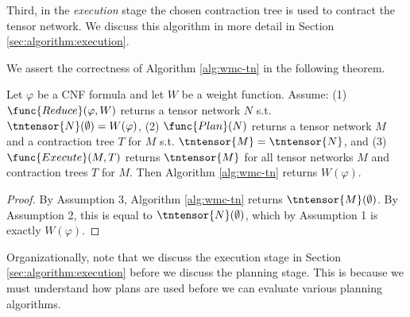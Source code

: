 Third, in the \emph{execution} stage the chosen contraction tree is used to contract the tensor network. We discuss this algorithm in more detail in Section \ref{sec:algorithm:execution}.

We assert the correctness of Algorithm \ref{alg:wmc-tn} in the following theorem.
\begin{theorem}
\label{thm:alg-correctness}
Let $\varphi$ be a CNF formula and let $W$ be a weight function. 
    Assume:
    (1) $\func{Reduce}(\varphi, W)$ returns a tensor network $N$ s.t. $\tntensor{N}(\emptyset) = W(\varphi)$,
    (2) $\func{Plan}(N)$ returns a tensor network $M$ and a contraction tree $T$ for $M$ s.t. $\tntensor{M} = \tntensor{N}$, and
    (3) $\func{Execute}(M, T)$ returns $\tntensor{M}$ for all tensor networks $M$ and contraction trees $T$ for $M$.
Then Algorithm \ref{alg:wmc-tn} returns $W(\varphi)$.
\end{theorem}
\begin{proof}
By Assumption 3, Algorithm \ref{alg:wmc-tn} returns $\tntensor{M}(\emptyset)$. By Assumption 2, this is equal to $\tntensor{N}(\emptyset)$, which by Assumption 1 is exactly $W(\varphi)$.
\end{proof}

Organizationally, note that we discuss the execution stage in Section \ref{sec:algorithm:execution} before we discuss the planning stage. This is because we must understand how plans are used before we can evaluate various planning algorithms.

